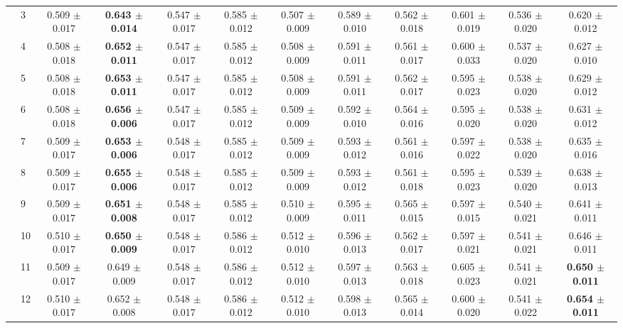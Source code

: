 \begin{table*}[t]
{\begin{tabular}{%
  ll
  @{\quad}
  c@{\hskip 4pt}c
  @{\quad\quad}
  c@{\hskip 4pt}c
  @{\quad\quad}
  c@{\hskip 4pt}c
  @{\quad\quad}
  c@{\hskip 4pt}c
  @{\quad\quad}
  c@{\hskip 4pt}c
}
        & 3 & 0.509 $\pm$ 0.017 & \textbf{0.643 $\pm$ 0.014} & 0.547 $\pm$ 0.017 & 0.585 $\pm$ 0.012 & 0.507 $\pm$ 0.009 & 0.589 $\pm$ 0.010 & 0.562 $\pm$ 0.018 & 0.601 $\pm$ 0.019 & 0.536 $\pm$ 0.020 & 0.620 $\pm$ 0.012 \\
        & 4 & 0.508 $\pm$ 0.018 & \textbf{0.652 $\pm$ 0.011} & 0.547 $\pm$ 0.017 & 0.585 $\pm$ 0.012 & 0.508 $\pm$ 0.009 & 0.591 $\pm$ 0.011 & 0.561 $\pm$ 0.017 & 0.600 $\pm$ 0.033 & 0.537 $\pm$ 0.020 & 0.627 $\pm$ 0.010 \\
        & 5 & 0.508 $\pm$ 0.018 & \textbf{0.653 $\pm$ 0.011} & 0.547 $\pm$ 0.017 & 0.585 $\pm$ 0.012 & 0.508 $\pm$ 0.009 & 0.591 $\pm$ 0.011 & 0.562 $\pm$ 0.017 & 0.595 $\pm$ 0.023 & 0.538 $\pm$ 0.020 & 0.629 $\pm$ 0.012 \\
        & 6 & 0.508 $\pm$ 0.018 & \textbf{0.656 $\pm$ 0.006} & 0.547 $\pm$ 0.017 & 0.585 $\pm$ 0.012 & 0.509 $\pm$ 0.009 & 0.592 $\pm$ 0.010 & 0.564 $\pm$ 0.016 & 0.595 $\pm$ 0.020 & 0.538 $\pm$ 0.020 & 0.631 $\pm$ 0.012 \\
        & 7 & 0.509 $\pm$ 0.017 & \textbf{0.653 $\pm$ 0.006} & 0.548 $\pm$ 0.017 & 0.585 $\pm$ 0.012 & 0.509 $\pm$ 0.009 & 0.593 $\pm$ 0.012 & 0.561 $\pm$ 0.016 & 0.597 $\pm$ 0.022 & 0.538 $\pm$ 0.020 & 0.635 $\pm$ 0.016 \\
        & 8 & 0.509 $\pm$ 0.017 & \textbf{0.655 $\pm$ 0.006} & 0.548 $\pm$ 0.017 & 0.585 $\pm$ 0.012 & 0.509 $\pm$ 0.009 & 0.593 $\pm$ 0.012 & 0.561 $\pm$ 0.018 & 0.595 $\pm$ 0.023 & 0.539 $\pm$ 0.020 & 0.638 $\pm$ 0.013 \\
        & 9 & 0.509 $\pm$ 0.017 & \textbf{0.651 $\pm$ 0.008} & 0.548 $\pm$ 0.017 & 0.585 $\pm$ 0.012 & 0.510 $\pm$ 0.009 & 0.595 $\pm$ 0.011 & 0.565 $\pm$ 0.015 & 0.597 $\pm$ 0.015 & 0.540 $\pm$ 0.021 & 0.641 $\pm$ 0.011 \\
        & 10 & 0.510 $\pm$ 0.017 & \textbf{0.650 $\pm$ 0.009} & 0.548 $\pm$ 0.017 & 0.586 $\pm$ 0.012 & 0.512 $\pm$ 0.010 & 0.596 $\pm$ 0.013 & 0.562 $\pm$ 0.017 & 0.597 $\pm$ 0.021 & 0.541 $\pm$ 0.021 & 0.646 $\pm$ 0.011 \\
        & 11 & 0.509 $\pm$ 0.017 & 0.649 $\pm$ 0.009 & 0.548 $\pm$ 0.017 & 0.586 $\pm$ 0.012 & 0.512 $\pm$ 0.010 & 0.597 $\pm$ 0.013 & 0.563 $\pm$ 0.018 & 0.605 $\pm$ 0.023 & 0.541 $\pm$ 0.021 & \textbf{0.650 $\pm$ 0.011} \\
        & 12 & 0.510 $\pm$ 0.017 & 0.652 $\pm$ 0.008 & 0.548 $\pm$ 0.017 & 0.586 $\pm$ 0.012 & 0.512 $\pm$ 0.010 & 0.598 $\pm$ 0.013 & 0.565 $\pm$ 0.014 & 0.600 $\pm$ 0.020 & 0.541 $\pm$ 0.022 & \textbf{0.654 $\pm$ 0.011} \\

\end{tabular}}
\end{table*}
